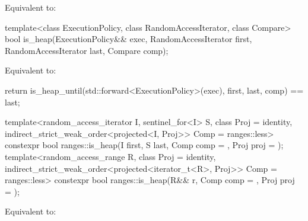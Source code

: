 \begin{itemdescr}
\pnum
\effects
Equivalent to: 
\end{itemdescr}

%
\begin{itemdecl}
template<class ExecutionPolicy, class RandomAccessIterator, class Compare>
  bool is_heap(ExecutionPolicy&& exec,
               RandomAccessIterator first, RandomAccessIterator last,
               Compare comp);
\end{itemdecl}

\begin{itemdescr}
\pnum
\effects
Equivalent to:
\begin{codeblock}
return is_heap_until(std::forward<ExecutionPolicy>(exec), first, last, comp) == last;
\end{codeblock}
\end{itemdescr}

%
\begin{itemdecl}
template<random_access_iterator I, sentinel_for<I> S, class Proj = identity,
         indirect_strict_weak_order<projected<I, Proj>> Comp = ranges::less>
  constexpr bool ranges::is_heap(I first, S last, Comp comp = {}, Proj proj = {});
template<random_access_range R, class Proj = identity,
         indirect_strict_weak_order<projected<iterator_t<R>, Proj>> Comp = ranges::less>
  constexpr bool ranges::is_heap(R&& r, Comp comp = {}, Proj proj = {});
\end{itemdecl}

\begin{itemdescr}
\pnum
\effects
Equivalent to:
\end{itemdescr}

